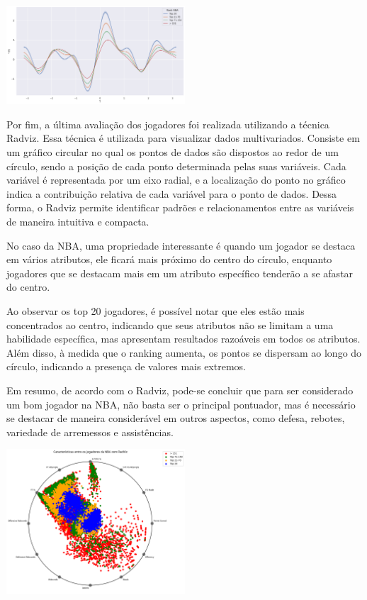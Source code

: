 \documentclass[
]{book}
\begin{document}
\includegraphics[width=0.5\textwidth,height=\textheight]{imagens/7.png}

Por fim, a última avaliação dos jogadores foi realizada utilizando a técnica Radviz. Essa técnica é utilizada para visualizar dados multivariados. Consiste em um gráfico circular no qual os pontos de dados são dispostos ao redor de um círculo, sendo a posição de cada ponto determinada pelas suas variáveis. Cada variável é representada por um eixo radial, e a localização do ponto no gráfico indica a contribuição relativa de cada variável para o ponto de dados. Dessa forma, o Radviz permite identificar padrões e relacionamentos entre as variáveis de maneira intuitiva e compacta.

No caso da NBA, uma propriedade interessante é quando um jogador se destaca em vários atributos, ele ficará mais próximo do centro do círculo, enquanto jogadores que se destacam mais em um atributo específico tenderão a se afastar do centro.

Ao observar os top 20 jogadores, é possível notar que eles estão mais concentrados ao centro, indicando que seus atributos não se limitam a uma habilidade específica, mas apresentam resultados razoáveis em todos os atributos. Além disso, à medida que o ranking aumenta, os pontos se dispersam ao longo do círculo, indicando a presença de valores mais extremos.

Em resumo, de acordo com o Radviz, pode-se concluir que para ser considerado um bom jogador na NBA, não basta ser o principal pontuador, mas é necessário se destacar de maneira considerável em outros aspectos, como defesa, rebotes, variedade de arremessos e assistências.

\includegraphics[width=0.5\textwidth,height=\textheight]{imagens/40.png}
\end{document}
